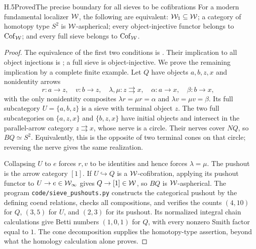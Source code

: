 \begin{claim}{H.5}{Proved}{The precise boundary for all sieves to be cofibrations}
For a modern fundamental localizer $\mathcal{W}$, the following are equivalent: $\mathcal{W}_1\subseteq\mathcal{W}$; a category of homotopy type $S^2$ is $\mathcal{W}$-aspherical; every object-injective functor belongs to $\operatorname{Cof}_{\mathcal{W}}$; and every full sieve belongs to $\operatorname{Cof}_{\mathcal{W}}$.
\end{claim}
\begin{proof}
The equivalence of the first two conditions is \citet[Proposition 9.2.17]{RootCisinski2006}. Their implication to all object injections is ; a full sieve is object-injective. We prove the remaining implication by a complete finite example. Let $Q$ have objects $a,b,z,x$ and nonidentity arrows
\[
 r:a\to z,\quad v:b\to z,\quad
 \lambda,\mu:z\rightrightarrows x,\quad
 \alpha:a\to x,\quad\beta:b\to x,
\]
with the only nonidentity composites
$\lambda r=\mu r=\alpha$ and $\lambda v=\mu v=\beta$.
Its full subcategory $U=\{a,b,z\}$ is a sieve with terminal object $z$. The two full subcategories on $\{a,z,x\}$ and $\{b,z,x\}$ have initial objects and intersect in the parallel-arrow category $z\rightrightarrows x$, whose nerve is a circle. Their nerves cover $NQ$, so $BQ\simeq S^2$. Equivalently, this is the opposite of two terminal cones on that circle; reversing the nerve gives the same realization.

Collapsing $U$ to $e$ forces $r,v$ to be identities and hence forces $\lambda=\mu$. The pushout is the arrow category $[1]$. If $U\hookrightarrow Q$ is a $\mathcal{W}$-cofibration, applying its pushout functor to $U\to e\in\mathcal{W}_{\infty}$ gives $Q\to[1]\in\mathcal{W}$, so $BQ$ is $\mathcal{W}$-aspherical. The program \texttt{code/sieve\_pushouts.py} constructs the categorical pushout by the defining coend relations, checks all compositions, and verifies the counts $(4,10)$ for $Q$, $(3,5)$ for $U$, and $(2,3)$ for its pushout. Its normalized integral chain calculations give Betti numbers $(1,0,1)$ for $Q$, with every nonzero Smith factor equal to $1$. The cone decomposition supplies the homotopy-type assertion, beyond what the homology calculation alone proves.
\end{proof}

